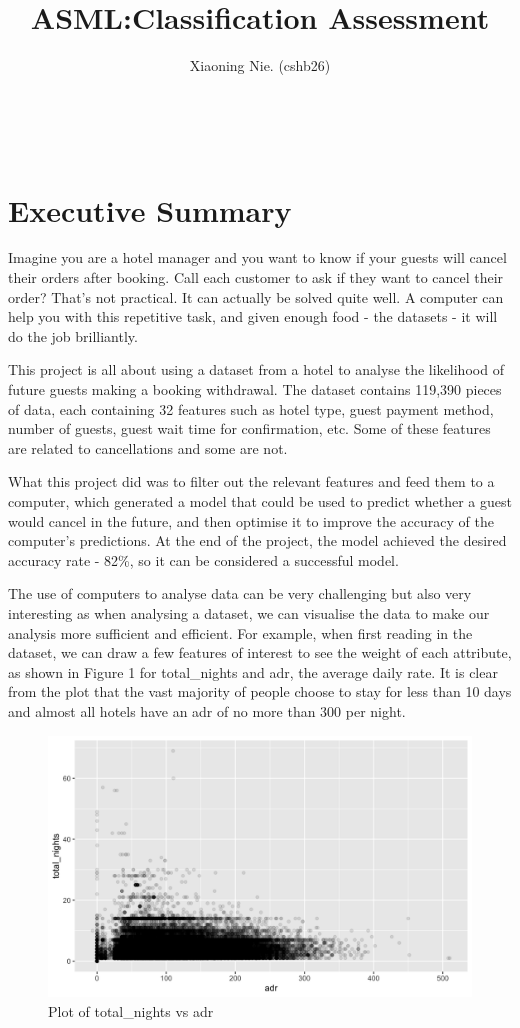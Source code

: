 \documentclass{article}
\title{ASML:Classification Assessment}
\author{Xiaoning Nie. (cshb26)}
\begin{document}
\maketitle

\ 


\section{Executive Summary}

Imagine you are a hotel manager and you want to know if your guests will cancel their orders after booking. Call each customer to ask if they want to cancel their order? That's not practical. It can actually be solved quite well. A computer can help you with this repetitive task, and given enough food - the datasets - it will do the job brilliantly.

This project is all about using a dataset from a hotel to analyse the likelihood of future guests making a booking withdrawal. The dataset contains 119,390 pieces of data, each containing 32 features such as hotel type, guest payment method, number of guests, guest wait time for confirmation, etc. Some of these features are related to cancellations and some are not.	

What this project did was to filter out the relevant features and feed them to a computer, which generated a model that could be used to predict whether a guest would cancel in the future, and then optimise it to improve the accuracy of the computer's predictions. At the end of the project, the model achieved the desired accuracy rate - 82\%, so it can be considered a successful model.

The use of computers to analyse data can be very challenging but also very interesting as when analysing a dataset, we can visualise the data to make our analysis more sufficient and efficient. For example, when first reading in the dataset, we can draw a few features of interest to see the weight of each attribute, as shown in Figure 1 for total\_nights and adr, the average daily rate. It is clear from the plot that the vast majority of people choose to stay for less than 10 days and almost all hotels have an adr of no more than 300 per night.

\begin{figure}[h]
\centering
\includegraphics[width=12cm]{nightadr.png} %
\caption{Plot of total\_nights vs adr} %
\end{figure}
\end{document}
